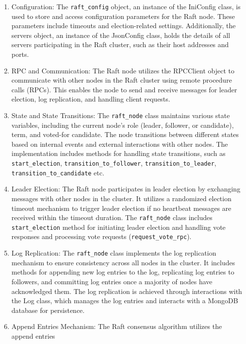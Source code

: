 \documentclass{article}
\begin{document}
\begin{enumerate}
    \item Configuration: The \texttt{raft\_config} object, an instance of the IniConfig 
    class, is used to store and access configuration parameters for the Raft node. These 
    parameters include timeouts and election-related settings. Additionally, the servers 
    object, an instance of the JsonConfig class, holds the details of all servers 
    participating in the Raft cluster, such as their host addresses and ports.
    \item RPC and Communication: The Raft node utilizes the RPCClient object to 
    communicate with other nodes in the Raft cluster using remote procedure calls (RPCs). 
    This enables the node to send and receive messages for leader election, log replication, 
    and handling client requests.
    \item State and State Transitions: The \texttt{raft\_node} class maintains various state 
    variables, including the current node's role (leader, follower, or candidate), term, and 
    voted-for candidate. The node transitions between different states based on internal 
    events and external interactions with other nodes. The implementation includes methods for 
    handling state transitions, such as \texttt{start\_election}, 
    \texttt{transition\_to\_follower}, \texttt{transition\_to\_leader}, 
    \texttt{transition\_to\_candidate} etc.
    \item Leader Election: The Raft node participates in leader election by exchanging 
    messages with other nodes in the cluster. It utilizes a randomized election timeout 
    mechanism to trigger leader election if no heartbeat messages are received within the 
    timeout duration. The \texttt{raft\_node} class includes \texttt{start\_election} method 
    for initiating leader election and handling vote responses and processing vote requests 
    (\texttt{request\_vote\_rpc}).
    \item Log Replication: The \texttt{raft\_node} class implements the log replication 
    mechanism to ensure consistency across all nodes in the cluster. It includes methods for 
    appending new log entries to the log, replicating log entries to followers, and committing 
    log entries once a majority of nodes have acknowledged them. The log replication is 
    achieved through interactions with the Log class, which manages the log entries and 
    interacts with a MongoDB database for persistence.
    \item Append Entries Mechanism: The Raft consensus algorithm utilizes the append entries 

\end{enumerate}
\end{document}
